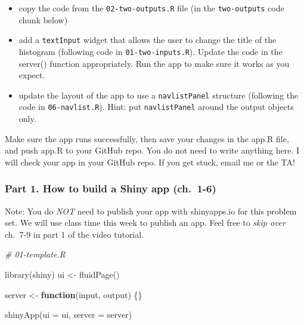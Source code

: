 \documentclass[
]{article}
\newenvironment{Shaded}{\begin{snugshade}}{\end{snugshade}}
\newcommand{\AttributeTok}[1]{\textcolor[rgb]{0.77,0.63,0.00}{#1}}
\newcommand{\CommentTok}[1]{\textcolor[rgb]{0.56,0.35,0.01}{\textit{#1}}}
\newcommand{\ControlFlowTok}[1]{\textcolor[rgb]{0.13,0.29,0.53}{\textbf{#1}}}
\newcommand{\FunctionTok}[1]{\textcolor[rgb]{0.00,0.00,0.00}{#1}}
\newcommand{\NormalTok}[1]{#1}
\newcommand{\OtherTok}[1]{\textcolor[rgb]{0.56,0.35,0.01}{#1}}
\providecommand{\tightlist}{%
  \setlength{\itemsep}{0pt}\setlength{\parskip}{0pt}}
\begin{document}
\begin{itemize}
\tightlist
\item
  copy the code from the \texttt{02-two-outputs.R} file (in the
  \texttt{two-outputs} code chunk below)
\item
  add a \texttt{textInput} widget that allows the user to change the
  title of the histogram (following code in \texttt{01-two-inputs.R}).
  Update the code in the server() function appropriately. Run the app to
  make sure it works as you expect.
\item
  update the layout of the app to use a \texttt{navlistPanel} structure
  (following the code in \texttt{06-navlist.R}). Hint: put
  \texttt{navlistPanel} around the output objects only.
\end{itemize}

Make sure the app runs successfully, then save your changes in the app.R
file, and push app.R to your GitHub repo. You do not need to write
anything here. I will check your app in your GitHub repo. If you get
stuck, email me or the TA!

\newpage

\hypertarget{part-1.-how-to-build-a-shiny-app-ch.-1-6}{%
\subsubsection{Part 1. How to build a Shiny app
(ch.~1-6)}\label{part-1.-how-to-build-a-shiny-app-ch.-1-6}}

Note: You do \emph{NOT} need to publish your app with shinyapps.io for
this problem set. We will use class time this week to publish an app.
Feel free to \emph{skip over} ch.~7-9 in part 1 of the video tutorial.

\begin{Shaded}
\begin{Highlighting}[]
\CommentTok{\# 01{-}template.R}

\FunctionTok{library}\NormalTok{(shiny)}
\NormalTok{ui }\OtherTok{\textless{}{-}} \FunctionTok{fluidPage}\NormalTok{()}

\NormalTok{server }\OtherTok{\textless{}{-}} \ControlFlowTok{function}\NormalTok{(input, output) \{\}}

\FunctionTok{shinyApp}\NormalTok{(}\AttributeTok{ui =}\NormalTok{ ui, }\AttributeTok{server =}\NormalTok{ server)}
\end{Highlighting}
\end{Shaded}
\end{document}
